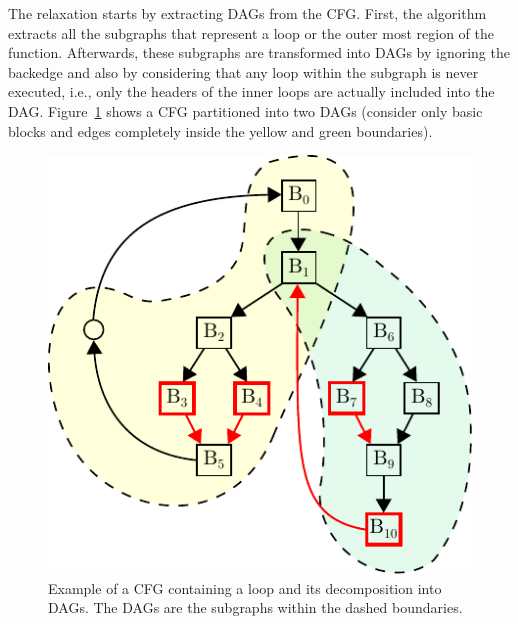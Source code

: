 The relaxation starts by extracting DAGs from the CFG.
First, the algorithm extracts all the subgraphs that represent a loop or the outer most region of the function.
Afterwards, these subgraphs are transformed into DAGs by ignoring the backedge
and also by considering that any loop within the subgraph is never executed,
i.e., only the headers of the inner loops are actually included into the DAG.
Figure~\ref{fig:cfg-relax-example} shows a CFG partitioned into two DAGs (consider
only basic blocks and edges completely inside the yellow and green boundaries).

\begin{figure}[h]
  \centering
  \includegraphics[scale=0.75]{figs/cfg-relax-example.pdf}
  \caption{Example of a CFG containing a loop and its decomposition into DAGs.
           The DAGs are the subgraphs within the dashed boundaries.}
  \label{fig:cfg-relax-example}
\end{figure}


